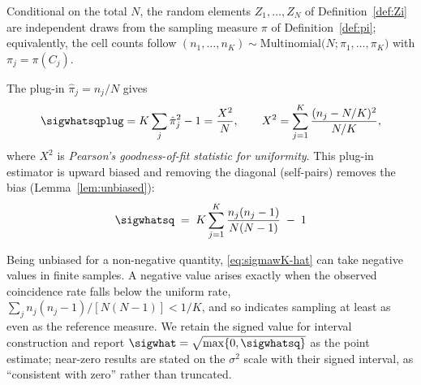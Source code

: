 \begin{assumption}
\label{ass:sample-pi}
Conditional on the total $N$, the random elements $Z_1,\dots,Z_N$ of
Definition~\ref{def:Zi} are independent draws from the sampling measure
$\pi$ of Definition~\ref{def:pi}; equivalently, the cell counts follow
$(n_1,\dots,n_K)\sim\mathrm{Multinomial}\big(N;\pi_1,\dots,\pi_K\big)$
with $\pi_j=\pi(C_j)$.
\end{assumption}

The plug-in $\hat\pi_j=n_j/N$ gives
\[
  \sigwhatsqplug
  =K\sum_j\hat\pi_j^2-1=\frac{X^2}{N},
  \qquad X^2=\sum_{j=1}^{K}\frac{(n_j-N/K)^2}{N/K},
\]
where $X^2$ is \emph{Pearson's goodness-of-fit statistic for
uniformity}.
This plug-in estimator is upward biased and removing the diagonal (self-pairs) removes the bias (Lemma~\ref{lem:unbiased}):
\begin{equation}
  \sigwhatsq
  \;=\;K\sum_{j=1}^{K}\frac{n_j(n_j-1)}{N(N-1)}\;-\;1
  \label{eq:sigmawK-hat}
\end{equation}

\begin{remark}
\label{rem:negative}
Being unbiased for a non-negative quantity,
\eqref{eq:sigmawK-hat} can take negative values in finite samples.
A negative value arises exactly when the observed coincidence rate falls below the uniform rate, $\sum_j n_j(n_j-1)/[N(N-1)]<1/K$, and so indicates sampling at least as
even as the reference measure.
We retain the signed value for interval construction and report
$\sigwhat=\sqrt{\max\{0,\sigwhatsq\}}$
as the point estimate; near-zero results are stated on the $\sigma^2$
scale with their signed interval, as ``consistent with zero'' rather than
truncated.
\end{remark}

